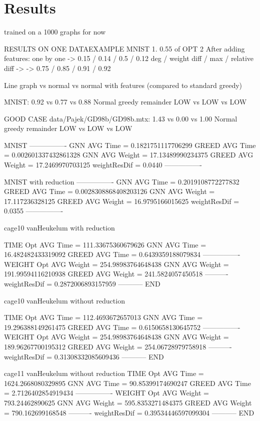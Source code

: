 \chapter{Results}

trained on a 1000 graphs for now

RESULTS ON ONE DATAEXAMPLE MNIST
1. 0.55 of OPT
2 After adding features:
  one by one
  -> 0.15 / 0.14 / 0.5 / 0.12
  deg / weight diff / max / relative diff ->
  -> 0.75 / 0.85 / 0.91 / 0.92


Line graph vs normal vs normal with features (compared to standard greedy)

MNIST:
0.92 vs  0.77 vs  0.88 
Normal greedy remainder
LOW vs LOW vs LOW 

GOOD CASE data/Pajek/GD98b/GD98b.mtx:
1.43 vs  0.00 vs 1.00
Normal greedy remainder
LOW vs LOW vs LOW

MNIST 
----------------
GNN AVG Time =  0.1821751117706299
GREED AVG Time =  0.002601337432861328
GNN AVG Weight =  17.13489990234375
GREED AVG Weight =  17.2469970703125
weightResDif =  0.0440
----------------

MNIST with reduction
----------------
GNN AVG Time =  0.2019108772277832
GREED AVG Time =  0.0028308868408203126
GNN AVG Weight =  17.117236328125
GREED AVG Weight =  16.9795166015625
weightResDif =  0.0355
----------------

cage10 vanHeukelum with reduction

TIME
Opt AVG Time =  111.33675360679626
GNN AVG Time =  16.482482433319092
GREED AVG Time =  0.6439359188079834
----------------
WEIGHT
Opt AVG Weight =  254.98983764648438
GNN AVG Weight =  191.99594116210938
GREED AVG Weight =  241.5824057450518
----------
weightResDif =  0.2872006893157959
-----------
END

cage10 vanHeukelum without reduction

TIME
Opt AVG Time =  112.4693672657013
GNN AVG Time =  19.296388149261475
GREED AVG Time =  0.6150658130645752
----------------
WEIGHT
Opt AVG Weight =  254.98983764648438
GNN AVG Weight =  189.96267700195312
GREED AVG Weight =  254.06728979758918
----------
weightResDif =  0.31308332085609436
-----------
END

cage11 vanHeukelum without reduction
TIME
Opt AVG Time =  1624.2668080329895
GNN AVG Time =  90.85399174690247
GREED AVG Time =  2.7126402854919434
----------------
WEIGHT
Opt AVG Weight =  793.24462890625
GNN AVG Weight =  595.8353271484375
GREED AVG Weight =  790.162699168548
----------
weightResDif =  0.39534446597099304
-----------
END


